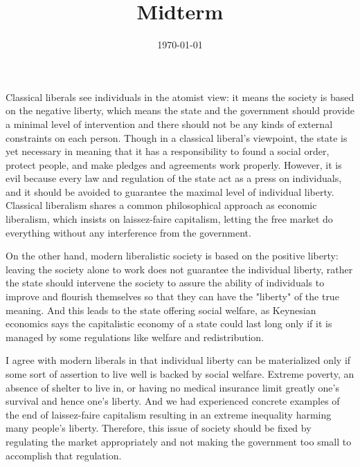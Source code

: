 \documentclass{homework}
\title{Midterm}
\date{\today}
\begin{document}
\maketitle


Classical liberals see individuals in the atomist view: it means the society is based on the negative liberty, which means the state and the government should provide a minimal level of intervention and there should not be any kinds of external constraints on each person. Though in a classical liberal's viewpoint, the state is yet necessary in meaning that it has a responsibility to found a social order, protect people, and make pledges and agreements work properly. However, it is evil because every law and regulation of the state act as a press on individuals, and it should be avoided to guarantee the maximal level of individual liberty. Classical liberalism shares a common philosophical approach as economic liberalism, which insists on laissez-faire capitalism, letting the free market do everything without any interference from the government.

On the other hand, modern liberalistic society is based on the positive liberty: leaving the society alone to work does not guarantee the individual liberty, rather the state should intervene the society to assure the ability of individuals to improve and flourish themselves so that they can have the "liberty" of the true meaning. And this leads to the state offering social welfare, as Keynesian economics says the capitalistic economy of a state could last long only if it is managed by some regulations like welfare and redistribution.

I agree with modern liberals in that individual liberty can be materialized only if some sort of assertion to live well is backed by social welfare. Extreme poverty, an absence of shelter to live in, or having no medical insurance limit greatly one's survival and hence one's liberty. And we had experienced concrete examples of the end of laissez-faire capitalism resulting in an extreme inequality harming many people's liberty. Therefore, this issue of society should be fixed by regulating the market appropriately and not making the government too small to accomplish that regulation. 
\end{document}
